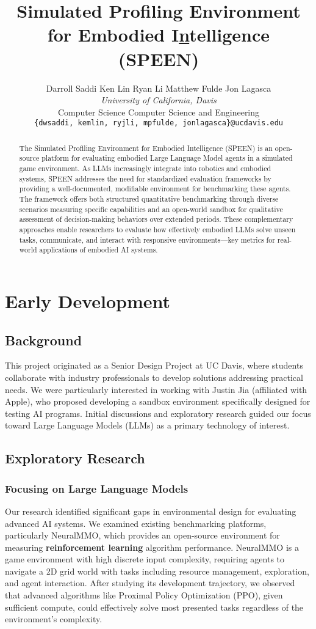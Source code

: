 \documentclass{article}
\title{Simulated Profiling Environment for Embodied I\underline{n}telligence (SPEEN)}
\author{%
    Darroll Saddi \quad
        Ken Lin \quad
        Ryan Li \quad
        Matthew Fulde \quad
        Jon Lagasca \vspace{0.5em} \\
        \textit{University of California, Davis} \\
        \vspace{0.5em}
        Computer Science \quad
        Computer Science and Engineering \\
        \texttt{\{dwsaddi, kemlin, ryjli, mpfulde, jonlagasca\}@ucdavis.edu}
    }
\begin{document}
\maketitle

\begin{abstract}
    The Simulated Profiling Environment for Embodied Intelligence (SPEEN) is an open-source platform for evaluating embodied Large Language Model agents in a simulated game environment.
    As LLMs increasingly integrate into robotics and embodied systems, SPEEN addresses the need for standardized evaluation frameworks by providing a well-documented, modifiable environment for benchmarking these agents.
    The framework offers both structured quantitative benchmarking through diverse scenarios measuring specific capabilities and an open-world sandbox for qualitative assessment of decision-making behaviors over extended periods.
    These complementary approaches enable researchers to evaluate how effectively embodied LLMs solve unseen tasks, communicate, and interact with responsive environments—key metrics for real-world applications of embodied AI systems.
\end{abstract}

\section{Early Development}

\subsection{Background}
This project originated as a Senior Design Project at UC Davis, where students collaborate with industry professionals to develop solutions addressing practical needs.
We were particularly interested in working with Justin Jia (affiliated with Apple), who proposed developing a sandbox environment specifically designed for testing AI programs.
Initial discussions and exploratory research guided our focus toward Large Language Models (LLMs) as a primary technology of interest.

\subsection{Exploratory Research}

\subsubsection{Focusing on Large Language Models}
Our research identified significant gaps in environmental design for evaluating advanced AI systems.
We examined existing benchmarking platforms, particularly NeuralMMO, which provides an open-source environment for measuring \textbf{reinforcement learning} algorithm performance.
NeuralMMO is a game environment with high discrete input complexity, requiring agents to navigate a 2D grid world with tasks including resource management, exploration, and agent interaction.
After studying its development trajectory, we observed that advanced algorithms like Proximal Policy Optimization (PPO), given sufficient compute, could effectively solve most presented tasks regardless of the environment's complexity.
\end{document}
